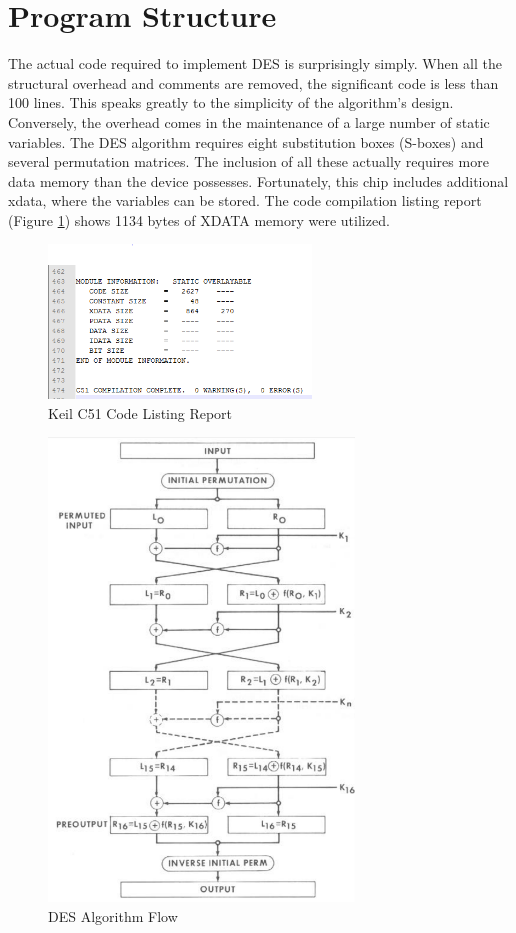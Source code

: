 \documentclass[conference]{IEEEtran}
\begin{document}
\section{Program Structure}
The actual code required to implement DES is surprisingly simply. When all the structural overhead and comments are removed, the significant code is less than 100 lines. This speaks greatly to the simplicity of the algorithm's design. Conversely, the overhead comes in the maintenance of a large number of static variables. The DES algorithm requires eight substitution boxes (S-boxes) and several permutation matrices. The inclusion of all these actually requires more data memory than the device possesses. Fortunately, this chip includes additional xdata, where the variables can be stored. The code compilation listing report (Figure \ref{fig:compilation_report}) shows 1134 bytes of XDATA memory were utilized.
\begin{figure}[ht]
	\centering
  \includegraphics[width=2.75in]{compilation_report.png}
  \caption{Keil C51 Code Listing Report}
  \label{fig:compilation_report}
\end{figure}
\begin{figure}[ht]
	\centering
  \includegraphics[width=3.2in]{des_algorithm.png}
  \caption{DES Algorithm Flow \cite{fips_46_3}}
  \label{fig:des_algorithm}
\end{figure}
\end{document}
